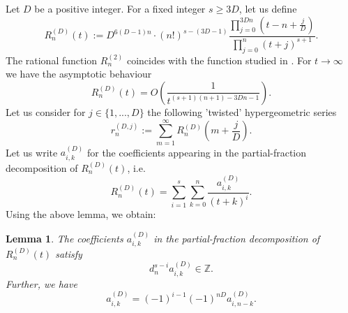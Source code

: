 \documentclass[11pt]{amsart}
\theoremstyle{plain}
\newtheorem{lem}[thm]{Lemma}
\theoremstyle{remark}
\theoremstyle{definition}
\newcommand{\ZZ}{\mathbb{Z}}
\begin{document}
Let $D$ be a positive integer. For a fixed integer $s\geq 3D$, let us define
\[
	R_n^{(D)}(t):=D^{6(D-1)n}\cdot (n!)^{s-(3D-1)}\frac{\prod_{j=0}^{3Dn}(t-n+\frac{j}{D})}{\prod_{j=0}^n(t+j)^{s+1}}.
\]
The rational function $R_n^{(2)}$ coincides with the function studied in \cite{zudilin}. For $t\rightarrow \infty$ we have the asymptotic behaviour
\[
	R_n^{(D)}(t)=O\left( \frac{1}{t^{(s+1)(n+1)-3Dn-1}}\right).
\]
  Let us consider for $j\in\{1,...,D\}$ the following 'twisted' hypergeometric series
\[
	r_n^{(D,j)}:=\sum_{m=1}^\infty R^{(D)}_n\left(m+\frac{j}{D}\right).
\]
Let us write $a_{i,k}^{(D)}$ for the coefficients appearing in the partial-fraction decomposition of $R^{(D)}_n(t)$, i.e.
\[
	R_n^{(D)}(t)=\sum_{i=1}^s\sum_{k=0}^n \frac{a_{i,k}^{(D)}}{(t+k)^i}.
\]
Using the above lemma, we obtain:
\begin{lem}\label{lem3}
	The coefficients $a_{i,k}^{(D)}$ in the partial-fraction decomposition of $R_n^{(D)}(t)$ satisfy
	\[
		d_n^{s-i} a_{i,k}^{(D)}\in\ZZ.
	\]
	Further, we have
	\[
		a_{i,k}^{(D)}=(-1)^{i-1}(-1)^{nD}a_{i,n-k}^{(D)}.
	\]
\end{lem}
\end{document}
